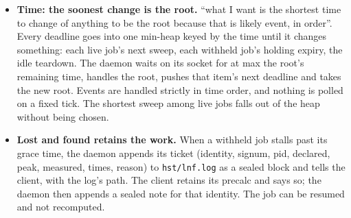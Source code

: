 \begin{itemize}
\begin{itemize}
\item The head's shadow time S is the earliest moment at which the running jobs' releases, taken in order of their expected ends e\_\allowbreak{}j = start\_\allowbreak{}j + t\_\allowbreak{}σj, free enough room: the least S with H + Σ\_\allowbreak{}\{e\_\allowbreak{}j ≤ S\} max(r\_\allowbreak{}j, u\_\allowbreak{}j) ≥ d\_\allowbreak{}h.
\item The spare at S is X = H + Σ\_\allowbreak{}\{e\_\allowbreak{}j ≤ S\} max(r\_\allowbreak{}j, u\_\allowbreak{}j) − d\_\allowbreak{}h: room the head will not need even when it starts.
\item A waiting job k behind the head is admitted now if d\_\allowbreak{}k ≤ H and either it ends before the shadow (now + t\_\allowbreak{}σk ≤ S) or it fits in the spare (d\_\allowbreak{}k ≤ X, and then X falls by d\_\allowbreak{}k).
\item A job whose signum has no history has no duration: it can never be proved not to delay the head, and it is not backfilled. It waits its turn, and its first run records (p\_\allowbreak{}σ, t\_\allowbreak{}σ).
\item If a job overruns its expected end, the head's shadow moves later. That is measured and reported like a growth, never hidden.
\end{itemize}
\item \textbf{Time: the soonest change is the root.} “what I want is the shortest time to change of anything to be the root because that is likely event, in order”. Every deadline goes into one min-heap keyed by the time until it changes something: each live job's next sweep, each withheld job's holding expiry, the idle teardown. The daemon waits on its socket for at max the root's remaining time, handles the root, pushes that item's next deadline and takes the new root. Events are handled strictly in time order, and nothing is polled on a fixed tick. The shortest sweep among live jobs falls out of the heap without being chosen.
\item \textbf{Lost and found retains the work.} When a withheld job stalls past its grace time, the daemon appends its ticket (identity, signum, pid, declared, peak, measured, times, reason) to \texttt{hst/\allowbreak{}lnf.\allowbreak{}log} as a sealed block and tells the client, with the log's path. The client retains its precalc and says so; the daemon then appends a sealed note for that identity. The job can be resumed and not recomputed.
\end{itemize}

